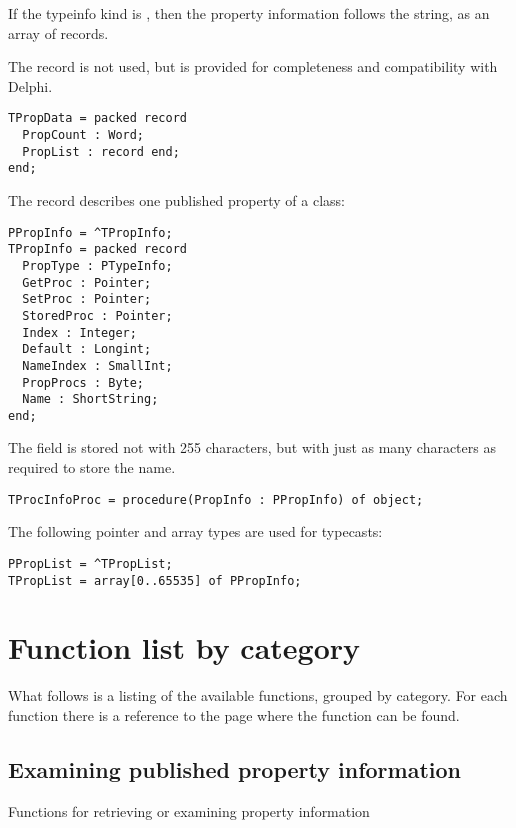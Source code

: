 If the typeinfo kind is , then the property 
information follows the  string, as an array of  records.

The  record is not used, but is provided for completeness and
compatibility with Delphi.
\begin{verbatim}
TPropData = packed record
  PropCount : Word;
  PropList : record end;
end;
\end{verbatim}
The  record describes one published property of a class:
\begin{verbatim}
PPropInfo = ^TPropInfo;
TPropInfo = packed record
  PropType : PTypeInfo;
  GetProc : Pointer;
  SetProc : Pointer;
  StoredProc : Pointer;
  Index : Integer;
  Default : Longint;
  NameIndex : SmallInt;
  PropProcs : Byte;
  Name : ShortString;
end;
\end{verbatim}
The  field is stored not with 255 characters, but with just as many characters
as required to store the name.
\begin{verbatim}
TProcInfoProc = procedure(PropInfo : PPropInfo) of object;
\end{verbatim}
The following pointer and array types are used for typecasts:
\begin{verbatim}
PPropList = ^TPropList;
TPropList = array[0..65535] of PPropInfo;
\end{verbatim}

\section{Function list by category}
What follows is a listing of the available functions, grouped by category.
For each function there is a reference to the page where the function
can be found.

\subsection{Examining published property information}
Functions for retrieving or examining property information
\begin{funclist}
\end{funclist}

